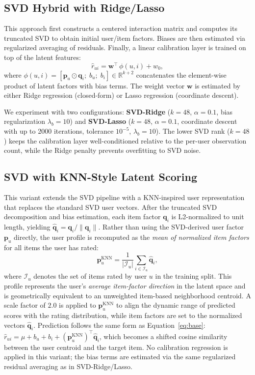 \documentclass[11pt]{article}
\begin{document}
\subsection{SVD Hybrid with Ridge/Lasso}

This approach first constructs a centered interaction matrix and computes its truncated SVD to obtain initial user/item factors.
Biases are then estimated via regularized averaging of residuals.
Finally, a linear calibration layer is trained on top of the latent features:
\begin{equation}
\hat{r}_{ui} = \mathbf{w}^\top\, \phi(u,i) + w_0,
\end{equation}
where $\phi(u,i) = [\mathbf{p}_u \odot \mathbf{q}_i;\; b_u;\; b_i] \in \mathbb{R}^{k+2}$ concatenates the element-wise product of latent factors with bias terms.
The weight vector $\mathbf{w}$ is estimated by either Ridge regression (closed-form) or Lasso regression (coordinate descent).

We experiment with two configurations: \textbf{SVD-Ridge} ($k{=}48$, $\alpha{=}0.1$, bias regularization $\lambda_b{=}10$) and \textbf{SVD-Lasso} ($k{=}48$, $\alpha{=}0.1$, coordinate descent with up to 2000 iterations, tolerance $10^{-5}$, $\lambda_b{=}10$).
The lower SVD rank ($k{=}48$) keeps the calibration layer well-conditioned relative to the per-user observation count, while the Ridge penalty prevents overfitting to SVD noise.

\subsection{SVD with KNN-Style Latent Scoring}

This variant extends the SVD pipeline with a KNN-inspired user representation that replaces the standard SVD user vectors.
After the truncated SVD decomposition and bias estimation, each item factor $\mathbf{q}_i$ is L2-normalized to unit length, yielding $\hat{\mathbf{q}}_i = \mathbf{q}_i / \|\mathbf{q}_i\|$.
Rather than using the SVD-derived user factor $\mathbf{p}_u$ directly, the user profile is recomputed as the \emph{mean of normalized item factors} for all items the user has rated:
\begin{equation}
\mathbf{p}_u^{\text{KNN}} = \frac{1}{|\mathcal{I}_u|}\sum_{i \in \mathcal{I}_u} \hat{\mathbf{q}}_i,
\end{equation}
where $\mathcal{I}_u$ denotes the set of items rated by user $u$ in the training split.
This profile represents the user's \emph{average item-factor direction} in the latent space and is geometrically equivalent to an unweighted item-based neighborhood centroid.
A scale factor of $2.0$ is applied to $\mathbf{p}_u^{\text{KNN}}$ to align the dynamic range of predicted scores with the rating distribution, while item factors are set to the normalized vectors $\hat{\mathbf{q}}_i$.
Prediction follows the same form as Equation~\eqref{eq:base}: $\hat{r}_{ui} = \mu + b_u + b_i + (\mathbf{p}_u^{\text{KNN}})^\top \hat{\mathbf{q}}_i$, which becomes a shifted cosine similarity between the user centroid and the target item.
No calibration regression is applied in this variant; the bias terms are estimated via the same regularized residual averaging as in SVD-Ridge/Lasso.
\end{document}
